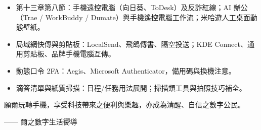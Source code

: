 
\begin{itemize}
  \item 第十三章第八節：手機遠控電腦（向日葵、ToDesk）及反詐紅線；AI 辦公（Trae / WorkBuddy / Dumate）與手機遙控電腦工作流；米哈遊人工桌面動態壁紙。
  \item 局域網快傳與剪貼板：LocalSend、飛鴿傳書、隔空投送；KDE Connect、通用剪貼板、品牌手機電腦互傳。
  \item 動態口令 2FA：Aegis、Microsoft Authenticator，備用碼與換機注意。
  \item 滴答清單與紙質掃描：日程/任務用法展開；掃描類工具與拍照技巧補全。
\end{itemize}

願爾玩轉手機，享受科技帶來之便利與樂趣，亦成為清醒、自信之數字公民。

—— 爾之數字生活嚮導

